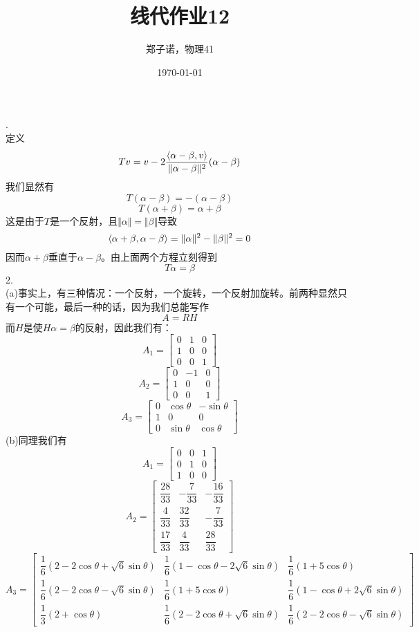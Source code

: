 \documentclass[utf8]{ctexart}
\title{线代作业12}
\author{郑子诺，物理41}
\date{\today}
\begin{document}
\maketitle
{}.\\
定义
\[Tv=v-2\frac{\braket{\alpha-\beta,v}}{\Vert\alpha-\beta\Vert^2}(\alpha-\beta)\]
我们显然有
\[T(\alpha-\beta)=-(\alpha-\beta)\]
\[T(\alpha+\beta)=\alpha+\beta\]
这是由于$T$是一个反射，且$\Vert\alpha\Vert=\Vert\beta\Vert$导致
\[\braket{\alpha+\beta,\alpha-\beta}=\Vert\alpha\Vert^2-\Vert\beta\Vert^2=0\]
因而$\alpha+\beta$垂直于$\alpha-\beta$。由上面两个方程立刻得到
\[T\alpha=\beta\]
2.\\
(a)事实上，有三种情况：一个反射，一个旋转，一个反射加旋转。前两种显然只有一个可能，最后一种的话，因为我们总能写作
\[A=RH\]
而$H$是使$H\alpha=\beta$的反射，因此我们有：
\[A_1=\begin{bmatrix}
	0&1&0\\
	1&0&0\\
	0&0&1
\end{bmatrix}\]
\[A_2=\begin{bmatrix}
	0&-1&0\\
	1&0&0\\
	0&0&1
\end{bmatrix}\]
\[A_3=\begin{bmatrix}
	0&\cos\theta&-\sin\theta\\
	1&0&0\\
	0&\sin\theta&\cos\theta
\end{bmatrix}\]
(b)同理我们有
\[A_1=\begin{bmatrix}
	0&0&1\\
	0&1&0\\
	1&0&0
\end{bmatrix}\]
\[A_2=\begin{bmatrix}
	\dfrac{28}{33}&-\dfrac{7}{33}&-\dfrac{16}{33}\\[8pt]
	\dfrac{4}{33}&\dfrac{32}{33}&-\dfrac{7}{33}\\[8pt]
	\dfrac{17}{33}&\dfrac{4}{33}&\dfrac{28}{33}
\end{bmatrix}\]
\[A_3=\begin{bmatrix}
	\dfrac{1}{6}(2-2\cos\theta+\sqrt{6}\sin\theta)&\dfrac{1}{6}(1-\cos\theta-2\sqrt{6}\sin\theta)&\dfrac{1}{6}(1+5\cos\theta)\\[8pt]
	\dfrac{1}{6}(2-2\cos\theta-\sqrt{6}\sin\theta)&\dfrac{1}{6}(1+5\cos\theta)&\dfrac{1}{6}(1-\cos\theta+2\sqrt{6}\sin\theta)\\[8pt]
	\dfrac{1}{3}(2+\cos\theta)&\dfrac{1}{6}(2-2\cos\theta+\sqrt{6}\sin\theta)&\dfrac{1}{6}(2-2\cos\theta-\sqrt{6}\sin\theta)
\end{bmatrix}\]
\end{document}
